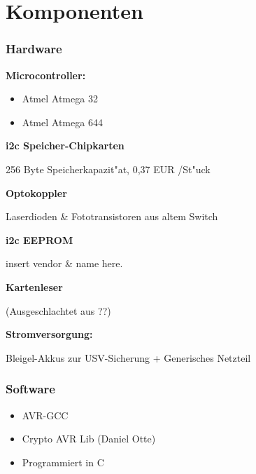 %

\section{Komponenten}
\begin{frame}
	\frametitle{Hardware}
	\textbf{Microcontroller:}
	\begin{itemize}
		\item Atmel Atmega 32
		\item Atmel Atmega 644
	\end{itemize}
	\par
	\textbf{i2c Speicher-Chipkarten} \begin{small}256 Byte Speicherkapazit"at, 0,37 EUR /St"uck\end{small}
	\par
	\textbf{Optokoppler} \begin{small}Laserdioden \& Fototransistoren aus altem Switch\end{small}
	\par
	\textbf{i2c EEPROM} \begin{small}insert vendor \& name here.\end{small}
	\par
	\textbf{Kartenleser} \begin{small}(Ausgeschlachtet aus ??)\end{small}
	\par
	\textbf{Stromversorgung:}\begin{small}Bleigel-Akkus zur USV-Sicherung + Generisches Netzteil\end{small}
\end{frame}

\begin{frame}
	\frametitle{Software}
	\begin{itemize}
		\item AVR-GCC
		\item Crypto AVR Lib (Daniel Otte)
		\item Programmiert in C
	\end{itemize}
\end{frame}
